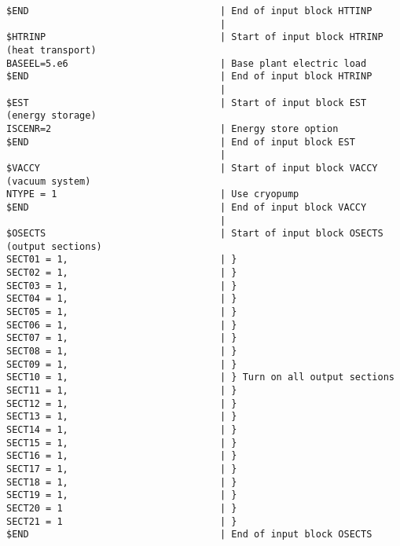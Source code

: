 \begin{verbatim}
$END                                  | End of input block HTTINP
                                      | 
$HTRINP                               | Start of input block HTRINP (heat transport)
BASEEL=5.e6                           | Base plant electric load
$END                                  | End of input block HTRINP
                                      | 
$EST                                  | Start of input block EST (energy storage)
ISCENR=2                              | Energy store option
$END                                  | End of input block EST
                                      | 
$VACCY                                | Start of input block VACCY (vacuum system)
NTYPE = 1                             | Use cryopump
$END                                  | End of input block VACCY
                                      | 
$OSECTS                               | Start of input block OSECTS (output sections)
SECT01 = 1,                           | }
SECT02 = 1,                           | }
SECT03 = 1,                           | }
SECT04 = 1,                           | }
SECT05 = 1,                           | }
SECT06 = 1,                           | }
SECT07 = 1,                           | }
SECT08 = 1,                           | }
SECT09 = 1,                           | }
SECT10 = 1,                           | } Turn on all output sections
SECT11 = 1,                           | }
SECT12 = 1,                           | }
SECT13 = 1,                           | }
SECT14 = 1,                           | }
SECT15 = 1,                           | }
SECT16 = 1,                           | }
SECT17 = 1,                           | }
SECT18 = 1,                           | }
SECT19 = 1,                           | }
SECT20 = 1                            | }
SECT21 = 1                            | }
$END                                  | End of input block OSECTS
\end{verbatim}
\normalsize
